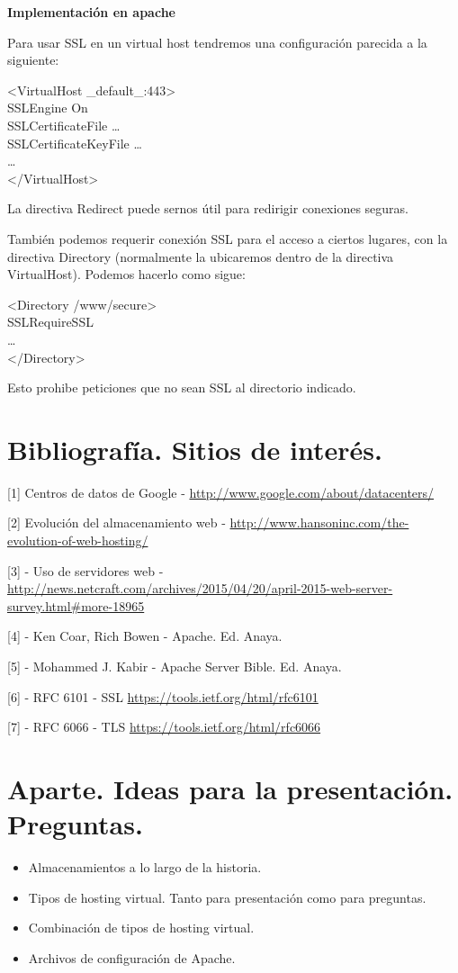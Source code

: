 \documentclass[a4paper, 10pt]{article} %
\begin{document}
\textbf{Implementación en apache}

Para usar SSL en un virtual host tendremos una configuración parecida a la siguiente: 

<VirtualHost \_default\_:443>\\
	SSLEngine On\\
	SSLCertificateFile    \dots\\
	SSLCertificateKeyFile \dots\\
	\dots\\
</VirtualHost> 

La directiva Redirect puede sernos útil para redirigir conexiones seguras. 

También podemos requerir conexión SSL para el acceso a ciertos lugares, con la directiva Directory (normalmente la ubicaremos dentro de la directiva VirtualHost). Podemos hacerlo como sigue:

<Directory /www/secure>\\
	SSLRequireSSL\\
	\dots\\
</Directory>

Esto prohibe peticiones que no sean SSL al directorio indicado. 

\section{Bibliografía. Sitios de interés.}

[1] Centros de datos de Google - \url{http://www.google.com/about/datacenters/}

[2] Evolución del almacenamiento web - \url{http://www.hansoninc.com/the-evolution-of-web-hosting/}

[3] - Uso de servidores web - \url{http://news.netcraft.com/archives/2015/04/20/april-2015-web-server-survey.html\#more-18965}

[4] - Ken Coar, Rich Bowen - Apache. Ed. Anaya. 

[5] - Mohammed J. Kabir - Apache Server Bible. Ed. Anaya. 

[6] - RFC 6101 - SSL \url{https://tools.ietf.org/html/rfc6101}

[7] - RFC 6066 - TLS \url{https://tools.ietf.org/html/rfc6066}

\section{Aparte. Ideas para la presentación. Preguntas.}
\begin{itemize}
\item Almacenamientos a lo largo de la historia. 
\item Tipos de hosting virtual. Tanto para presentación como para preguntas. 
\item Combinación de tipos de hosting virtual. 
\item Archivos de configuración de Apache.
\end{itemize}
\end{document}
